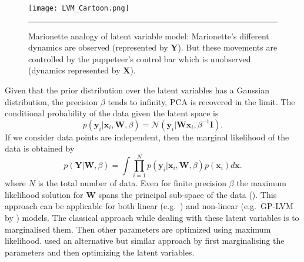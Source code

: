 \begin{figure}
	\centering
		\texttt{[image: LVM\_Cartoon.png]}
		\rule{35em}{0.5pt}
	\caption[Marionette analogy of latent variable model]
		{Marionette analogy of latent variable model: Marionette's different dynamics are observed (represented by $\textbf{Y}$). But these movements are controlled by the puppeteer's control bar which is unobserved (dynamics represented by $\textbf{X}$).}
	\label{fig:LVM_Cartoon}
\end{figure}

Given that the prior distribution over the latent variables has a Gaussian distribution, the precision $\beta$ tends to infinity, PCA is recovered in the limit. The conditional probability of the data given the latent space is
\begin{equation} \label{eq:cond_prob_latent_space}
p\left(\textbf{y}_i|\textbf{x}_i,\textbf{W},\beta \right) = \mathcal{N} \left(\textbf{y}_i|\textbf{W}\textbf{x}_i,\beta^{-1}\textbf{I}\right).
\end{equation}
If we consider data points are independent, then the marginal likelihood of the data is obtained by
\begin{equation} \label{eq:marginal_likelihood_latent_space}
p\left(\textbf{Y}|\textbf{W},\beta \right) = 
\int \prod^{N}_{i=1} p\left(\textbf{y}_i|\textbf{x}_i,\textbf{W},\beta\right)p\left(\textbf{x}_i\right)d\textbf{x}.
\end{equation}
where $N$ is the total number of data. Even for finite precision $\beta$ the maximum likelihood solution for $\textbf{W}$ spans the principal sub-space of the data (\cite{Tipping:1999}). This approach can be applicable for both linear (e.g.\ \cite{Silva:2006}) and non-linear (e.g.\ GP-LVM by \cite{Lawrence:2005}) models. The classical approach while dealing with these latent variables is to marginalised them. Then other parameters are optimized using maximum likelihood. \cite{Lawrence:2005} used an alternative but similar approach by first marginalising the parameters and then optimizing the latent variables.

